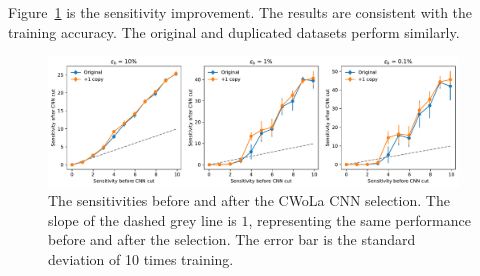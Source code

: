 \documentclass[12pt]{article}
\begin{document}
        Figure~\ref{fig:sensitivity_improvement_split_validation_first} is the sensitivity improvement. The results are consistent with the training accuracy. The original and duplicated datasets perform similarly.
        \begin{figure}[htpb]
            \centering
            \includegraphics[width=0.97\textwidth]{HVmodel_sensitivity_improvement_origin_copy_1_split_val.pdf}
            \caption{The sensitivities before and after the CWoLa CNN selection. The slope of the dashed grey line is $1$, representing the same performance before and after the selection. The error bar is the standard deviation of 10 times training.}
            \label{fig:sensitivity_improvement_split_validation_first}
        \end{figure}
\end{document}
